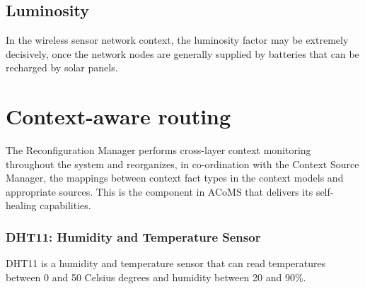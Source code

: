 \subsection{Luminosity}
In the wireless sensor network context, the luminosity factor may be extremely decisively, once the network nodes are generally supplied by batteries that can be recharged by solar panels.

\section{Context-aware routing}
The Reconfiguration Manager performs cross-layer context monitoring throughout the system and reorganizes, in co-ordination with the Context Source Manager, the mappings between context fact types in the context models and appropriate sources. This is the component in ACoMS that delivers its self-healing capabilities.




\subsubsection{DHT11: Humidity and Temperature Sensor}

DHT11 is a humidity and temperature sensor that can read temperatures between 0 and 50 Celsius degrees and humidity between 20 and 90\%.

